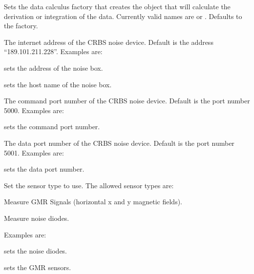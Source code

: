 Sets the data calculus factory that creates the object that will
calculate the derivation or integration of the data. Currently valid names are
 or .
Defaults to the  factory.

\label{par:crbsnoise_address}

The internet address of the CRBS noise device.
Default is the address ``189.101.211.228''.
Examples are:
\begin{compactitem}
\item {} sets the address of the noise box.
\item {} sets the host name of the noise box.
\end{compactitem}

\label{par:crbsnoise_command_port}

The command port number of the CRBS noise device.
Default is the port number 5000.
Examples are:
\begin{compactitem}
\item {} sets the command port number.
\end{compactitem}

\label{par:crbsnoise_data_port}

The data port number of the CRBS noise device.
Default is the port number 5001.
Examples are:
\begin{compactitem}
\item {} sets the data port number.
\end{compactitem}

\label{par:crbsnoise_sensor_type}

Set the sensor type to use. The allowed sensor types are:
\begin{asparadesc}
\item[\code{GMR\_XY}]
Measure GMR Signals (horizontal x and y magnetic fields).
\item[\code{NOISE\_DIODES}]
Measure noise diodes.
\end{asparadesc}

Examples are:
\begin{compactitem}
\item {} sets the noise diodes.
\item {} sets the GMR sensors.
\end{compactitem}

